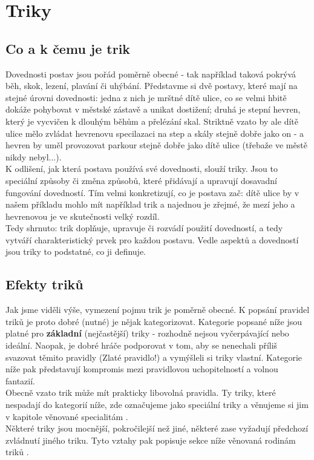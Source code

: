 \documentclass[../main.tex]{subfiles}
\begin{document}
\chapter{Triky}
\label{chap:triky}

\section{Co a k čemu je trik}
\label{sec:coakcemu-trik}
Dovednosti postav jsou pořád poměrně obecné - tak například taková  pokrývá běh, skok, lezení, plavání či uhýbání. Představme si dvě postavy, které mají  na stejné úrovni dovednosti: jedna z nich je mrštné dítě ulice, co se velmi hbitě dokáže pohybovat v městské zástavě a unikat dostižení; druhá je stepní hevren, který je vycvičen k dlouhým běhům a přelézání skal. Striktně vzato by ale dítě ulice mělo zvládat hevrenovu specilazaci na step a skály stejně dobře jako on - a hevren by uměl provozovat parkour stejně dobře jako dítě ulice (třebaže ve městě nikdy nebyl...).\\
K odlišení, jak která postava používá své dovednosti, slouží triky. Jsou to speciální způsoby či změna způsobů, které přidávají a upravují dosavadní fungování dovedností. Tím velmi konkretizují, co je postava zač: dítě ulice by v našem příkladu mohlo mít například trik   a najednou je zřejmé, že mezí jeho a hevrenovou  je ve skutečnosti velký rozdíl.\\
Tedy shrnuto: trik doplňuje, upravuje či rozvádí použití dovedností, a tedy vytváří charakteristický prvek pro každou postavu. Vedle aspektů a dovedností jsou triky to podstatné, co ji definuje.


\section{Efekty triků}
\label{sec:trik-efekty}
Jak jsme viděli výše, vymezení pojmu trik je poměrně obecné. K popsání pravidel triků je proto dobré (nutné) je nějak kategorizovat. Kategorie popsané níže jsou platné pro \textbf{základní} (nejčastější) triky - rozhodně nejsou vyčerpávající nebo ideální. Naopak, je dobré hráče podporovat v tom, aby se nenechali příliš svazovat těmito pravidly (Zlaté pravidlo!) a vymýšleli si triky vlastní. Kategorie níže pak představují kompromis mezi pravidlovou uchopitelností a volnou fantazií.\\
Obecně vzato trik může mít prakticky libovolná pravidla. Ty triky, které nespadají do kategorií níže, zde označujeme jako speciální triky a věnujeme si jim v kapitole věnované specialitám .\\
Některé triky jsou mocnější, pokročilejší než jiné, některé zase vyžadují předchozí zvládnutí jiného triku. Tyto vztahy pak popisuje sekce níže věnovaná rodinám triků . 
\end{document}
